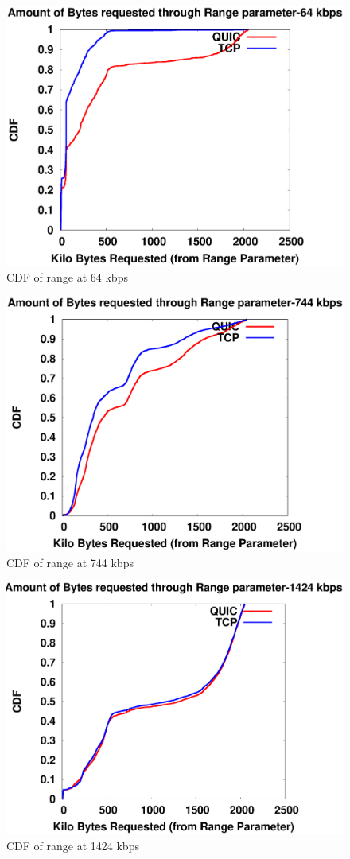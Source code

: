 \begin{figure}[!ht]
    \centering
    \includegraphics[width=0.9\linewidth]{img/CDF/plot_range_65536}
    \caption{CDF of range at 64 kbps}
    \label{fig:range6556}
\end{figure}
\begin{figure}[!ht]
    \centering
    \includegraphics[width=0.9\linewidth]{img/CDF/plot_range_761856}
    \caption{CDF of range at 744 kbps}
    \label{fig:rang4761}
\end{figure}
\begin{figure}[!ht]
    \centering
    \includegraphics[width=0.9\linewidth]{img/CDF/plot_range_1458176}
    \caption{CDF of range at 1424 kbps}
    \label{fig:rang761}
\end{figure}


